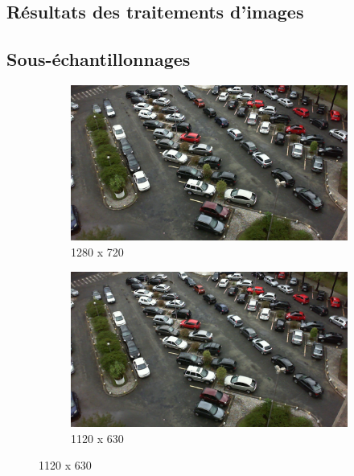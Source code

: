 \begin{appendix}
\chapter{Résultats des traitements d'images}
\section{Sous-échantillonnages} \label{annexe.traitement.downsampling}

\begin{figure}[H]
    \centering
    \begin{subfigure}{.4\textwidth}
        \centering
        \includegraphics[width=.85\linewidth]{img/conception/image_process/downsample_only/7.png}
        \caption{1280 x 720}
    \end{subfigure}%
    \begin{subfigure}{.4\textwidth}
        \centering
        \includegraphics[width=.85\linewidth]{img/conception/image_process/downsample_only/6.png}
        \caption{1120 x 630}
    \end{subfigure}%


\end{figure}
\end{appendix}
